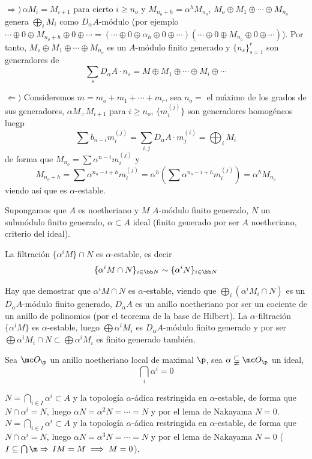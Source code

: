 \begin{dem}
    $\Rightarrow) \, \alpha M_i = M_{i+1}$ para cierto $i \ge n_o$ y $M_{n_o+h} = \alpha^h M_{n_o}$, $M_o\oplus M_1 \oplus \cdots \oplus M_{n_o}$ genera $\bigoplus_i M_i$ como $D_{\alpha}A$-m\'odulo (por ejemplo $\cdots \oplus 0\oplus M_{n_o+h} \oplus 0 \oplus \cdots= (\cdots \oplus 0\oplus \alpha_h \oplus 0 \oplus \cdots)(\cdots \oplus 0\oplus M_{n_o} \oplus 0 \oplus \cdots)$). Por tanto, $M_o\oplus M_1 \oplus \cdots \oplus M_{n_o}$ es un $A$-m\'odulo finito generado y $\{n_s\}_{s=1}^r$ son generadores de $$\sum_s D_{\alpha }A\cdot n_s = M \oplus M_1 \oplus \cdots \oplus M_i \oplus \cdots $$

    $\Leftarrow)$ Consideremos $m=m_o+m_1+\cdots +m_r$, sea $n_o=$ el m\'aximo de los grados de sus generadores, $\alpha M_ = M_{i+1}$ para $i \ge n_o$, $\{m_i^{(j)}\}$ son generadores homog\'eneos luegp 
    $$ \sum b_{n-i} m_i^{(j)} = \sum_{i,j} D_{\alpha} A \cdot m_j^{(i)}  = \bigoplus_i M_i$$
    de forma que $M_{n_o} = \sum \alpha^{n-i} m_i^{(j)}$ y 
    $$M_{n_o+h} = \sum \alpha^{n_o-i+h} m_i^{(j)} = \alpha^h\left( \sum \alpha^{n_o-i+h} m_i^{(j)} \right) = \alpha^h M_{n_o}$$
    viendo as\'i que es $\alpha$-estable.
\end{dem}
Supongamos que $A$ es noetheriano y $M$ $A$-m\'odulo finito generado, $N$ un subm\'odulo finito generado, $\alpha \subset A$ ideal (finito generado por ser $A$ noetheriano, criterio del ideal). 
\begin{teo}
    La filtraci\'on $\{\alpha^i M\} \cap N$ es $\alpha$-estable, es decir
    $$\{\alpha^i M \cap N\}_{i \in \bb N} \sim\{\alpha^i N\}_{i \in \bb N}$$
\end{teo}
\begin{dem}
    Hay que demostrar que $\alpha^iM \cap N$ es $\alpha$-estable, viendo que $\bigoplus_i(\alpha^i M_i \cap N)$ es un $D_{\alpha}A$-m\'odulo finito generado, $D_{\alpha}A$ es un anillo noetheriano por ser un cociente de un anillo de polinomios (por el teorema de la base de Hilbert). La $\alpha$-filtraci\'on $\{\alpha^i M\}$ es $\alpha$-estable, luego $\bigoplus \alpha^i M_i$ es $D_{\alpha} A$-m\'odulo finito generado y por ser $\bigoplus \alpha^i M_i \cap N \subset \bigoplus \alpha^i M_i$ es finito generado tambi\'en.
\end{dem}
\begin{cor}
    Sea $\mc O_{\p}$ un anillo noetheriano local de maximal $\p$, sea $\alpha \subsetneqq \mc O_{\p}$ un ideal, 
    $$\bigcap_i \alpha^i = 0$$
\end{cor}
\begin{dem}
    $N = \bigcap_{i \in I} \alpha^i \subset A$ y la topolog\'ia $\alpha$-\'adica restringida en $\alpha$-estable, de forma que $N \cap \alpha^i = N$, luego $\alpha N =\alpha^2 N= \cdots = N$ y por el lema de Nakayama $N=0$. 
    $N = \bigcap_{i \in I} \alpha^i \subset A$ y la topolog\'ia $\alpha$-\'adica restringida en $\alpha$-estable, de forma que $N \cap \alpha^i = N$, luego $\alpha N =\alpha^3 N= \cdots = N$ y por el lema de Nakayama $N=0$ ($I\subseteq \bigcap \m \Rightarrow \, IM = M \implies M = 0$). 

\end{dem}



